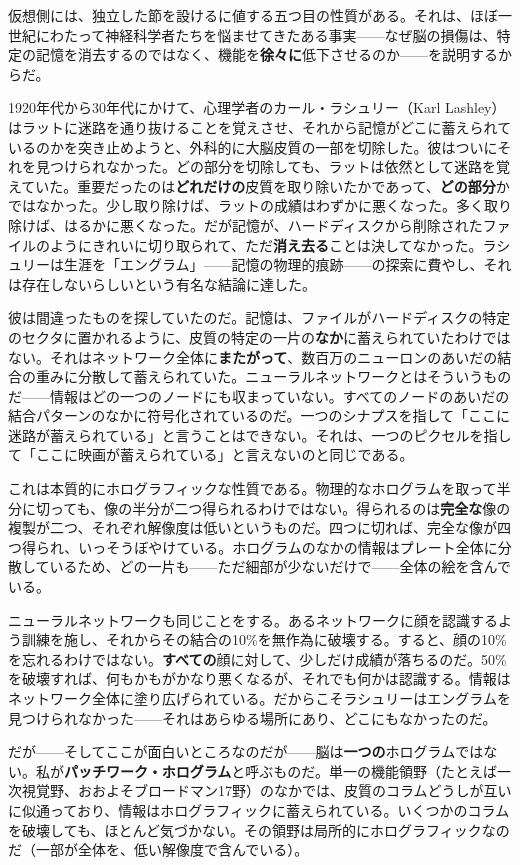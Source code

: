 \documentclass[11pt, twoside, openright]{book}
\begin{document}
仮想側には、独立した節を設けるに値する五つ目の性質がある。それは、ほぼ一世紀にわたって神経科学者たちを悩ませてきたある事実------なぜ脳の損傷は、特定の記憶を消去するのではなく、機能を\textbf{徐々に}低下させるのか------を説明するからだ。

1920年代から30年代にかけて、心理学者のカール・ラシュリー（Karl Lashley）はラットに迷路を通り抜けることを覚えさせ、それから記憶がどこに蓄えられているのかを突き止めようと、外科的に大脳皮質の一部を切除した。彼はついにそれを見つけられなかった。どの部分を切除しても、ラットは依然として迷路を覚えていた。重要だったのは\textbf{どれだけの}皮質を取り除いたかであって、\textbf{どの部分}かではなかった。少し取り除けば、ラットの成績はわずかに悪くなった。多く取り除けば、はるかに悪くなった。だが記憶が、ハードディスクから削除されたファイルのようにきれいに切り取られて、ただ\textbf{消え去る}ことは決してなかった。ラシュリーは生涯を「エングラム」------記憶の物理的痕跡------の探索に費やし、それは存在しないらしいという有名な結論に達した。

彼は間違ったものを探していたのだ。記憶は、ファイルがハードディスクの特定のセクタに置かれるように、皮質の特定の一片の\textbf{なか}に蓄えられていたわけではない。それはネットワーク全体に\textbf{またがって}、数百万のニューロンのあいだの結合の重みに分散して蓄えられていた。ニューラルネットワークとはそういうものだ------情報はどの一つのノードにも収まっていない。すべてのノードのあいだの結合パターンのなかに符号化されているのだ。一つのシナプスを指して「ここに迷路が蓄えられている」と言うことはできない。それは、一つのピクセルを指して「ここに映画が蓄えられている」と言えないのと同じである。

これは本質的にホログラフィックな性質である。物理的なホログラムを取って半分に切っても、像の半分が二つ得られるわけではない。得られるのは\textbf{完全な}像の複製が二つ、それぞれ解像度は低いというものだ。四つに切れば、完全な像が四つ得られ、いっそうぼやけている。ホログラムのなかの情報はプレート全体に分散しているため、どの一片も------ただ細部が少ないだけで------全体の絵を含んでいる。

ニューラルネットワークも同じことをする。あるネットワークに顔を認識するよう訓練を施し、それからその結合の10\%を無作為に破壊する。すると、顔の10\%を忘れるわけではない。\textbf{すべての}顔に対して、少しだけ成績が落ちるのだ。50\%を破壊すれば、何もかもがかなり悪くなるが、それでも何かは認識する。情報はネットワーク全体に塗り広げられている。だからこそラシュリーはエングラムを見つけられなかった------それはあらゆる場所にあり、どこにもなかったのだ。

だが------そしてここが面白いところなのだが------脳は\textbf{一つの}ホログラムではない。私が\textbf{パッチワーク・ホログラム}と呼ぶものだ。単一の機能領野（たとえば一次視覚野、おおよそブロードマン17野）のなかでは、皮質のコラムどうしが互いに似通っており、情報はホログラフィックに蓄えられている。いくつかのコラムを破壊しても、ほとんど気づかない。その領野は局所的にホログラフィックなのだ（一部が全体を、低い解像度で含んでいる）。
\end{document}
